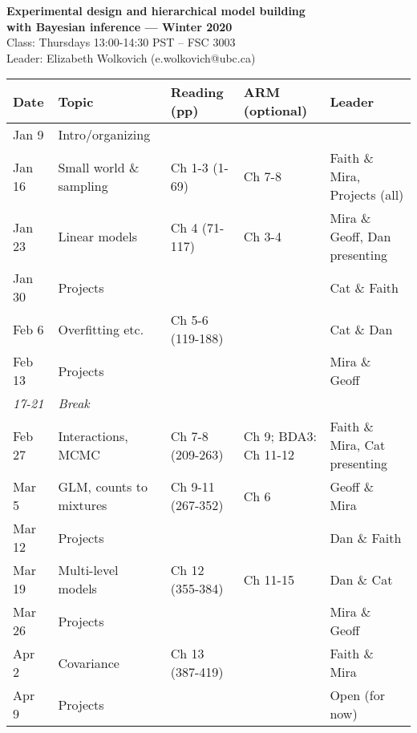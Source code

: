 \documentclass[11pt]{article}
\renewcommand{\baselinestretch}{1.20}
\begin{document}
 
\begin{center} {\large \textbf{Experimental design and hierarchical model building \\ with Bayesian inference --- Winter 2020}}\\ [10pt] %
Class: Thursdays 13:00-14:30 PST -- FSC 3003  \\ 
Leader: Elizabeth Wolkovich (e.wolkovich@ubc.ca) \\
\end{center} 
\renewcommand{\baselinestretch}{1.10}

\begin{center}
\begin{tabular}{p{1.2cm} p{3.5cm}  p{3.5cm}  p{2.5cm}  p{3cm} }
   \textbf{Date}
   & \textbf{Topic}
      & \textbf{Reading (pp)}
        & \textbf{ARM (optional)}
         & \textbf{Leader}  \\ 
\hline \hline
Jan 9  & Intro/organizing &           &    & \\ %
Jan 16 & Small world \& sampling       &     Ch 1-3  (1-69)  & Ch 7-8 & Faith \& Mira, Projects (all) \\ %
Jan 23 &  Linear models        &       Ch 4 (71-117) \footnotemark[1] & Ch 3-4  & Mira \&  Geoff, Dan presenting\\ 
Jan 30 & Projects & & & Cat \& Faith\\
Feb 6  & Overfitting etc.      &   Ch 5-6 (119-188)\footnotemark[2] & & Cat \& Dan  \\ %
Feb 13 & Projects & & & Mira \& Geoff \\
\emph{17-21}  &    \emph{Break}     &               &        & \\
Feb 27   & Interactions, MCMC &  Ch 7-8 (209-263) & Ch 9; BDA3: Ch 11-12&  Faith \& Mira, Cat presenting\\ %
Mar 5   & GLM, counts to mixtures               &    Ch 9-11 (267-352) & Ch 6 & Geoff \& Mira \\ %
Mar 12 & Projects & & &  Dan \& Faith\\
Mar 19  & Multi-level models          &  Ch 12 (355-384)    &  Ch 11-15   & Dan \& Cat \\
Mar 26 & Projects & & & Mira \& Geoff \\
Apr 2  & Covariance &        Ch 13 (387-419)   & & Faith \& Mira \\ %
Apr 9 & Projects & & & Open (for now) \\
\hline
\end{tabular}
\end{center}
\end{document}
